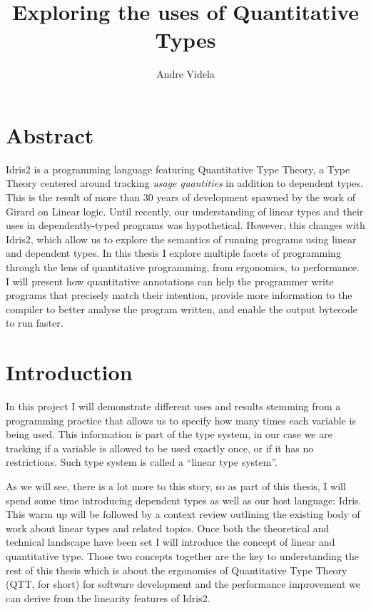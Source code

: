 \documentclass[
]{article}
\author{}
\date{}
\begin{document}
\title{Exploring the uses of Quantitative Types}
\author{Andre Videla}
\maketitle

\hypertarget{abstract}{%
\section{Abstract}\label{abstract}}

Idris2 is a programming language featuring Quantitative Type Theory, a
Type Theory centered around tracking \emph{usage quantities} in addition
to dependent types. This is the result of more than 30 years of
development spawned by the work of Girard on Linear logic. Until
recently, our understanding of linear types and their uses in
dependently-typed programs was hypothetical. However, this changes with
Idris2, which allow us to explore the semantics of running programs
using linear and dependent types. In this thesis I explore multiple
facets of programming through the lens of quantitative programming, from
ergonomics, to performance. I will present how quantitative annotations
can help the programmer write programs that precisely match their
intention, provide more information to the compiler to better analyse
the program written, and enable the output bytecode to run faster.

\newpage
\setcounter{tocdepth}{2}
\setcounter{secnumdepth}{2}
\tableofcontents
\newpage

\hypertarget{introduction}{%
\section{Introduction}\label{introduction}}

In this project I will demonstrate different uses and results stemming
from a programming practice that allows us to specify how many times
each variable is being used. This information is part of the type
system, in our case we are tracking if a variable is allowed to be used
exactly once, or if it has no restrictions. Such type system is called a
``linear type system''.

As we will see, there is a lot more to this story, so as part of this
thesis, I will spend some time introducing dependent types as well as
our host language: Idris. This warm up will be followed by a context
review outlining the existing body of work about linear types and
related topics. Once both the theoretical and technical landscape have
been set I will introduce the concept of linear and quantitative type.
Those two concepts together are the key to understanding the rest of
this thesis which is about the ergonomics of Quantitative Type
Theory\cite{qtt}\cite{nuttin} (QTT, for short) for software development
and the performance improvement we can derive from the linearity
features of Idris2.
\end{document}
